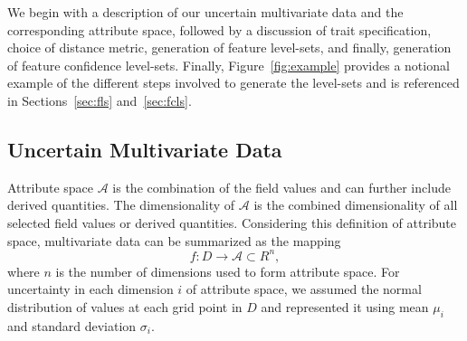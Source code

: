 \setlength{\belowdisplayskip}{4pt} \setlength{\belowdisplayshortskip}{4pt}
\setlength{\abovedisplayskip}{4pt} \setlength{\abovedisplayshortskip}{4pt}

We begin with a description of our uncertain multivariate data and the corresponding attribute space, followed by a discussion of trait specification, choice of distance metric, generation of feature level-sets, and finally, generation of feature confidence level-sets.
%
Finally, Figure~\ref{fig:example} provides a notional example of the different steps involved to generate the level-sets and is referenced in Sections~\ref{sec:fls} and~\ref{sec:fcls}.
%

\vspace{-2mm}
\subsection{Uncertain Multivariate Data}
%
%
%
%
Attribute space $\mathcal{A}$ is the combination of the field values and can further include derived quantities.
%
The dimensionality of $\mathcal{A}$ is the combined dimensionality of all selected field values or derived quantities.
%
Considering this definition of attribute space, multivariate data can be summarized as the mapping
\begin{equation}
f : D \to \mathcal{A} \subset R^{n},
\end{equation}
%
where $n$ is the number of dimensions used to form attribute space. 
%
%
For uncertainty in each dimension $i$ of attribute space, we assumed the normal distribution of values at each grid point in $D$ and represented it using mean ${\mu}_{i}$ and standard deviation ${\sigma}_{i}$. 

\vspace{-2mm}
